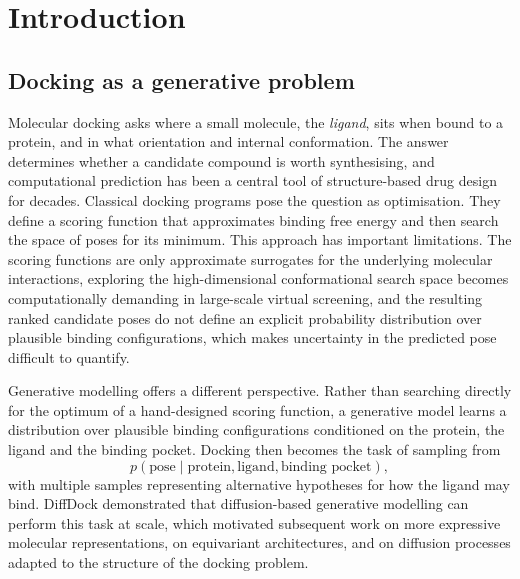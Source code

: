 \documentclass[11pt,a4paper]{report}
\theoremstyle{plain}
\theoremstyle{definition}
\theoremstyle{remark}
\begin{document}
\tableofcontents

\chapter{Introduction}
\label{ch:intro}

\section{Docking as a generative problem}

Molecular docking asks where a small molecule, the \emph{ligand}, sits when
bound to a protein, and in what orientation and internal conformation. The
answer determines whether a candidate compound is worth synthesising, and
computational prediction has been a central tool of structure-based drug
design for decades. Classical docking programs pose the question as
optimisation. They define a scoring function that approximates binding free
energy and then search the space of poses for its minimum. This approach has
important limitations. The scoring functions are only approximate surrogates
for the underlying molecular interactions, exploring the high-dimensional
conformational search space becomes computationally demanding in large-scale
virtual screening, and the resulting ranked candidate poses do not define an
explicit probability distribution over plausible binding configurations, which
makes uncertainty in the predicted pose difficult to quantify.

Generative modelling offers a different perspective. Rather than searching
directly for the optimum of a hand-designed scoring function, a generative
model learns a distribution over plausible binding configurations conditioned
on the protein, the ligand and the binding pocket. Docking then becomes the
task of sampling from
\begin{equation}
    p(\text{pose}\mid\text{protein},\text{ligand},\text{binding pocket}),
    \label{eq:docking-as-sampling}
\end{equation}
with multiple samples representing alternative hypotheses for how the ligand
may bind. DiffDock \citep{corso2023diffdock} demonstrated that diffusion-based
generative modelling can perform this task at scale, which motivated
subsequent work on more expressive molecular representations, on equivariant
architectures, and on diffusion processes adapted to the structure of the
docking problem.
\end{document}

